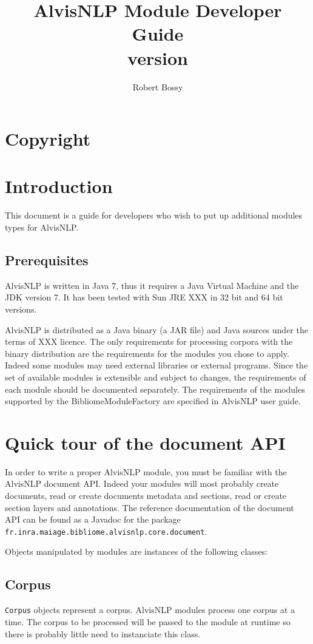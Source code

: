 \documentclass[a4paper]{article}
\title{AlvisNLP Module Developer Guide\\version \version}
\author{Robert Bossy}
\begin{document}
\maketitle
\tableofcontents

\section{Copyright}
\license

\section{Introduction}
This document is a guide for developers who wish to put up additional modules types for AlvisNLP.

\subsection{Prerequisites}
AlvisNLP is written in Java 7, thus it requires a Java Virtual Machine and the JDK version 7.
It has been tested with Sun JRE XXX in 32 bit and 64 bit versions.

AlvisNLP is distributed as a Java binary (a JAR file) and Java sources under the terms of XXX licence.
The only requirements for processing corpora with the binary distribution are the requirements for the modules you chose to apply.
Indeed some modules may need external libraries or external programs.
Since the set of available modules is extensible and subject to changes, the requirements of each module should be documented separately.
The requirements of the modules supported by the BibliomeModuleFactory are specified in AlvisNLP user guide.

\section{Quick tour of the document API}
\label{DocumentAPI}

In order to write a proper AlvisNLP module, you must be familiar with the AlvisNLP document API.
Indeed your modules will most probably create documents, read or create documents metadata and sections, read or create section layers and annotations.
The reference documentation of the document API can be found as a Javadoc for the package \texttt{fr.inra.maiage.bibliome.alvisnlp.core.document}.

Objects manipulated by modules are instances of the following classes:

\subsection{Corpus}
\texttt{Corpus} objects represent a corpus.
AlvisNLP modules process one corpus at a time.
The corpus to be processed will be passed to the module at runtime so there is probably little need to instanciate this class.
\end{document}
